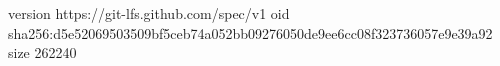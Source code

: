 version https://git-lfs.github.com/spec/v1
oid sha256:d5e52069503509bf5ceb74a052bb09276050de9ee6cc08f323736057e9e39a92
size 262240
